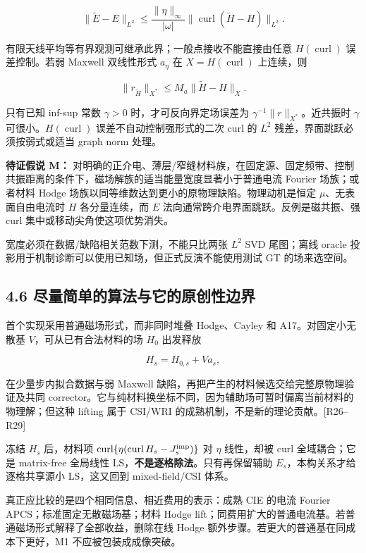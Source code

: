 \documentclass[11pt,a4paper]{article}
\begin{document}
\[
\|\widetilde E-E\|_{L^2}
\le\frac{\|\eta\|_\infty}{|\omega|}
\|\operatorname{curl}(\widetilde H-H)\|_{L^2}.
\]

有限天线平均等有界观测可继承此界；一般点接收不能直接由任意
\(H(\operatorname{curl})\) 误差控制。若弱 Maxwell 双线性形式 \(a_\eta\)
在 \(X=H(\operatorname{curl})\) 上连续，则

\[
\|r_{\widetilde H}\|_{X^*}
\le M_a\|\widetilde H-H\|_X.
\]

只有已知 inf-sup 常数 \(\gamma>0\) 时，才可反向界定场误差为
\(\gamma^{-1}\|r\|_{X^*}\)。近共振时 \(\gamma\)
可很小。\(H(\operatorname{curl})\) 误差不自动控制强形式的二次 curl 的
\(L^2\) 残差，界面跳跃必须按弱式或适当 graph norm 处理。

\textbf{待证假说 M：}
对明确的正介电、薄层/窄缝材料族，在固定源、固定频带、控制共振距离的条件下，磁场解族的适当能量宽度显著小于普通电流
Fourier 场族；或者材料 Hodge
场族以同等维数达到更小的原物理缺陷。物理动机是恒定
\(\mu\)、无表面自由电流时 \(H\) 各分量连续，而 \(E\)
法向通常跨介电界面跳跃。反例是磁共振、强 curl
集中或移动尖角使这项优势消失。

宽度必须在数据/缺陷相关范数下测，不能只比两张 \(L^2\) SVD 尾图；离线
oracle 投影用于机制诊断可以使用已知场，但正式反演不能使用测试 GT
的场来选空间。

\hypertarget{ux5c3dux91cfux7b80ux5355ux7684ux7b97ux6cd5ux4e0eux5b83ux7684ux539fux521bux6027ux8fb9ux754c}{%
\subsection{4.6
尽量简单的算法与它的原创性边界}\label{ux5c3dux91cfux7b80ux5355ux7684ux7b97ux6cd5ux4e0eux5b83ux7684ux539fux521bux6027ux8fb9ux754c}}

首个实现采用普通磁场形式，而非同时堆叠 Hodge、Cayley 和
A17。对固定小无散基 \(V\)，可从已有合法材料的场 \(H_0\) 出发释放

\[
H_s=H_{0,s}+Va_s,
\]

在少量步内拟合数据与弱 Maxwell
缺陷，再把产生的材料候选交给完整原物理验证及共同
corrector。它与纯材料换坐标不同，因为辅助场可暂时偏离当前材料的物理解；但这种
lifting 属于 CSI/WRI 的成熟机制，不是新的理论贡献。{[}R26--R29{]}

冻结 \(H_s\) 后，材料项
\(\operatorname{curl}\{\eta(\operatorname{curl}H_s-J_s^{\rm imp})\}\) 对
\(\eta\) 线性，却被 curl 全域耦合；它是 matrix-free 全局线性
LS，\textbf{不是逐格除法}。只有再保留辅助
\(E_s\)，本构关系才给逐格共享源小 LS，这又回到 mixed-field/CSI 体系。

真正应比较的是四个相同信息、相近费用的表示：成熟 CIE 的电流 Fourier
APCS；标准固定无散磁场基；材料 Hodge
lift；同费用扩大的普通电流基。若普通磁场形式解释了全部收益，删除在线
Hodge 额外步骤。若更大的普通基在同成本下更好，M1 不应被包装成成像突破。
\end{document}
